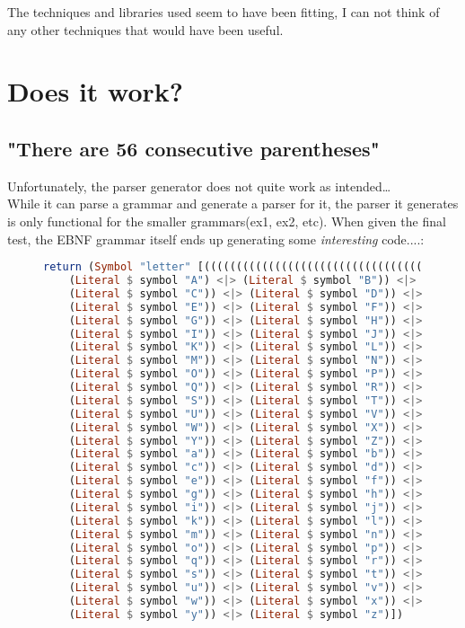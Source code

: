 \documentclass{article}
\begin{document}
The techniques and libraries used seem to have been fitting, I can not think of any other techniques that would have been useful.



\section{Does it work?}
\subsection{"There are 56 consecutive parentheses"}
    Unfortunately, the parser generator does not quite work as intended\dots\\
    While it can parse a grammar and generate a parser for it, the parser it generates is only functional for the smaller grammars(ex1, ex2, etc). 
    When given the final test, the EBNF grammar itself ends up generating some \textit{interesting} code....: \newpage
    \begin{figure}[H]
            \begin{lstlisting}[language=Haskell]
return (Symbol "letter" [((((((((((((((((((((((((((((((((((((((((((((((((((
    (Literal $ symbol "A") <|> (Literal $ symbol "B")) <|> 
    (Literal $ symbol "C")) <|> (Literal $ symbol "D")) <|> 
    (Literal $ symbol "E")) <|> (Literal $ symbol "F")) <|> 
    (Literal $ symbol "G")) <|> (Literal $ symbol "H")) <|> 
    (Literal $ symbol "I")) <|> (Literal $ symbol "J")) <|> 
    (Literal $ symbol "K")) <|> (Literal $ symbol "L")) <|> 
    (Literal $ symbol "M")) <|> (Literal $ symbol "N")) <|> 
    (Literal $ symbol "O")) <|> (Literal $ symbol "P")) <|> 
    (Literal $ symbol "Q")) <|> (Literal $ symbol "R")) <|> 
    (Literal $ symbol "S")) <|> (Literal $ symbol "T")) <|> 
    (Literal $ symbol "U")) <|> (Literal $ symbol "V")) <|> 
    (Literal $ symbol "W")) <|> (Literal $ symbol "X")) <|> 
    (Literal $ symbol "Y")) <|> (Literal $ symbol "Z")) <|> 
    (Literal $ symbol "a")) <|> (Literal $ symbol "b")) <|> 
    (Literal $ symbol "c")) <|> (Literal $ symbol "d")) <|> 
    (Literal $ symbol "e")) <|> (Literal $ symbol "f")) <|> 
    (Literal $ symbol "g")) <|> (Literal $ symbol "h")) <|> 
    (Literal $ symbol "i")) <|> (Literal $ symbol "j")) <|> 
    (Literal $ symbol "k")) <|> (Literal $ symbol "l")) <|> 
    (Literal $ symbol "m")) <|> (Literal $ symbol "n")) <|> 
    (Literal $ symbol "o")) <|> (Literal $ symbol "p")) <|> 
    (Literal $ symbol "q")) <|> (Literal $ symbol "r")) <|> 
    (Literal $ symbol "s")) <|> (Literal $ symbol "t")) <|> 
    (Literal $ symbol "u")) <|> (Literal $ symbol "v")) <|> 
    (Literal $ symbol "w")) <|> (Literal $ symbol "x")) <|> 
    (Literal $ symbol "y")) <|> (Literal $ symbol "z")])
            \end{lstlisting}
    \end{figure}
    
\end{document}
